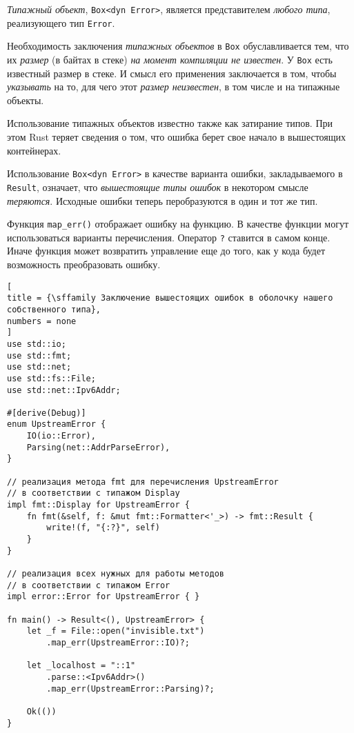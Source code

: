 \documentclass[%
	11pt,
	a4paper,
	utf8,
		]{article}
\begin{document}
{\color{blue}
\emph{Типажный объект}, \verb|Box<dyn Error>|, является представителем \emph{любого типа}, реализующего тип \verb|Error|.
}

{\color{red}Необходимость заключения \emph{типажных объектов} в \verb|Box| обуславливается тем, что их \emph{размер} (в байтах в стеке) \emph{на момент компиляции не известен}.} У \verb|Box| есть известный размер в стеке. {\color{blue}И смысл его применения заключается в том, чтобы \emph{указывать} на то, для чего этот \emph{размер неизвестен}, в том числе и на типажные объекты.}

Использование типажных объектов известно также как затирание типов. При этом Rust теряет сведения о том, что ошибка берет свое начало в вышестоящих контейнерах.

Использование \verb|Box<dyn Error>| в качестве варианта ошибки, закладываемого в \verb|Result|, означает, что \emph{вышестоящие типы ошибок} в некотором смысле \emph{теряются}. {\color{blue}Исходные ошибки теперь перобразуются в один и тот же тип.}

Функция \verb|map_err()| отображает ошибку на функцию. В качестве функции могут использоваться варианты перечисления. Оператор \verb|?| ставится в самом конце. Иначе функция может возвратить управление еще до того, как у кода будет возможность преобразовать ошибку.

\begin{lstlisting}[
title = {\sffamily Заключение вышестоящих ошибок в оболочку нашего собственного типа},
numbers = none
]
use std::io;
use std::fmt;
use std::net;
use std::fs::File;
use std::net::Ipv6Addr;

#[derive(Debug)]
enum UpstreamError {
    IO(io::Error),
    Parsing(net::AddrParseError),
}

// реализация метода fmt для перечисления UpstreamError
// в соответствии с типажом Display
impl fmt::Display for UpstreamError {
    fn fmt(&self, f: &mut fmt::Formatter<'_>) -> fmt::Result {
        write!(f, "{:?}", self)
    }
}

// реализация всех нужных для работы методов
// в соответствии с типажом Error
impl error::Error for UpstreamError { }

fn main() -> Result<(), UpstreamError> {
    let _f = File::open("invisible.txt")
        .map_err(UpstreamError::IO)?;
        
    let _localhost = "::1"
        .parse::<Ipv6Addr>()
        .map_err(UpstreamError::Parsing)?;
        
    Ok(())
}
\end{lstlisting}
\end{document}
